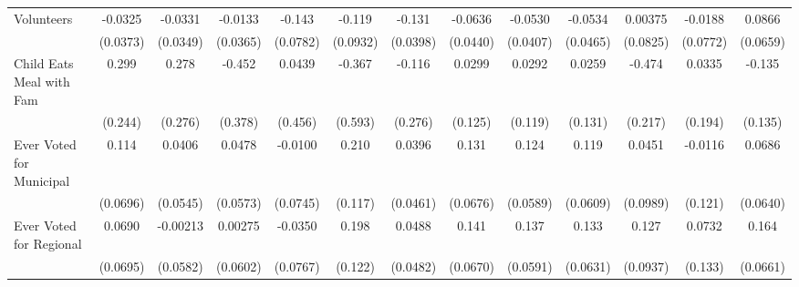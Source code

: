 {\begin{tabular}{l*{12}{c}}
\addlinespace
Volunteers  &     -0.0325         &     -0.0331         &     -0.0133         &      -0.143         &      -0.119         &      -0.131\sym{**} &     -0.0636         &     -0.0530         &     -0.0534         &     0.00375         &     -0.0188         &      0.0866         \\
            &    (0.0373)         &    (0.0349)         &    (0.0365)         &    (0.0782)         &    (0.0932)         &    (0.0398)         &    (0.0440)         &    (0.0407)         &    (0.0465)         &    (0.0825)         &    (0.0772)         &    (0.0659)         \\
\addlinespace
Child Eats Meal with Fam&       0.299         &       0.278         &      -0.452         &      0.0439         &      -0.367         &      -0.116         &      0.0299         &      0.0292         &      0.0259         &      -0.474\sym{*}  &      0.0335         &      -0.135         \\
            &     (0.244)         &     (0.276)         &     (0.378)         &     (0.456)         &     (0.593)         &     (0.276)         &     (0.125)         &     (0.119)         &     (0.131)         &     (0.217)         &     (0.194)         &     (0.135)         \\
\addlinespace
Ever Voted for Municipal&       0.114         &      0.0406         &      0.0478         &     -0.0100         &       0.210         &      0.0396         &       0.131         &       0.124\sym{*}  &       0.119         &      0.0451         &     -0.0116         &      0.0686         \\
            &    (0.0696)         &    (0.0545)         &    (0.0573)         &    (0.0745)         &     (0.117)         &    (0.0461)         &    (0.0676)         &    (0.0589)         &    (0.0609)         &    (0.0989)         &     (0.121)         &    (0.0640)         \\
\addlinespace
Ever Voted for Regional&      0.0690         &    -0.00213         &     0.00275         &     -0.0350         &       0.198         &      0.0488         &       0.141\sym{*}  &       0.137\sym{*}  &       0.133\sym{*}  &       0.127         &      0.0732         &       0.164\sym{*}  \\
            &    (0.0695)         &    (0.0582)         &    (0.0602)         &    (0.0767)         &     (0.122)         &    (0.0482)         &    (0.0670)         &    (0.0591)         &    (0.0631)         &    (0.0937)         &     (0.133)         &    (0.0661)         \\

\end{tabular}}
